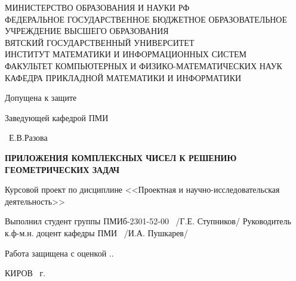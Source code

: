 \begin{titlepage}
    \begin{center}
        \begin{small}
            \begin{singlespace}
                \MakeUppercase{
                    МИНИСТЕРСТВО ОБРАЗОВАНИЯ И НАУКИ РФ\\ \vspace{0.7em}
                    Федеральное государственное бюджетное образовательное учреждение  высшего образования\\
                    ВЯТСКИЙ ГОСУДАРСТВЕННЫЙ УНИВЕРСИТЕТ\\ \vspace{0.7em}
                    Институт математики и информационных систем \\ \vspace{0.7em}
                    Факультет компьютерных и физико-математических наук\\ \vspace{0.7em}
                    Кафедра прикладной математики и информатики
                }
            \end{singlespace}
        \end{small}
        \vfill
        {\raggedleft
            Допущена к защите

            Заведующей кафедрой ПМИ

            \uline{\mbox{\hspace{9em}}}~Е.В.Разова

        }
        \vspace{5em}

        \MakeUppercase{
            \large{
                {\bfseries Приложения комплексных чисел к решению геометрических задач}
            }}
        \vspace{2em}

        Курсовой проект по дисциплине <<Проектная и научно-исследовательская деятельность>>
    \end{center}
    \vfill
    Выполнил студент группы ПМИб-2301-52-00 { \uline{\mbox{\hspace{9em}}}~/Г.Е. Ступников/}
    Руководитель к.ф-м.н. доцент кафедры ПМИ { \uline{\mbox{\hspace{8.5em}}}~/И.А. Пушкарев/}
    \vspace{2em}

    {\raggedright
        Работа защищена с оценкой \uline{\mbox{\hspace{6em}}} \hfill \uline{\mbox{\hspace{2.5em}}}.\uline{\mbox{\hspace{2.5em}}}.\the\year\
    }
    \vfill

    \begin{center}
        \MakeUppercase{Киров} \the\year\ г.
    \end{center}
\end{titlepage}
\setcounter{page}{2}
